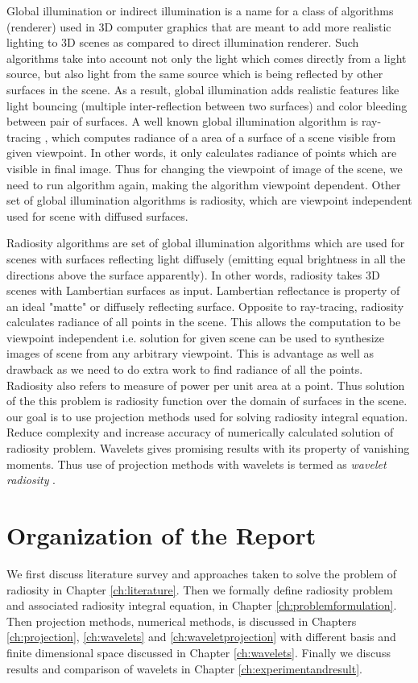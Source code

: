 Global illumination or indirect illumination is a name for a class of algorithms  (renderer) used in 3D computer graphics that are meant to add more realistic lighting to 3D scenes as compared to direct illumination renderer. Such algorithms take into account not only the light which comes directly from a light source, but also light from the same source which is being reflected by other surfaces in the scene. As a result, global illumination adds realistic features like light bouncing  (multiple inter-reflection between two surfaces) and color bleeding between pair of surfaces. A well known global illumination algorithm is ray-tracing \cite{Whitted}, which computes  radiance of a area of a surface of a scene visible  from given viewpoint. In other words, it only calculates radiance of points which are visible in final image. Thus for changing the viewpoint of image of the scene, we need to run algorithm again, making the algorithm viewpoint dependent. Other set of global illumination algorithms is radiosity, which are viewpoint independent used for scene with diffused surfaces.


Radiosity algorithms are set of global illumination algorithms which are used for scenes with surfaces reflecting light diffusely (emitting equal brightness in all the directions above the surface apparently). In other words, radiosity takes 3D scenes with Lambertian surfaces as input. Lambertian reflectance is property of an ideal "matte" or diffusely reflecting surface. Opposite to ray-tracing, radiosity calculates radiance of all points in the scene. This allows the computation to be viewpoint independent i.e. solution for given scene can be used to synthesize images of scene from any arbitrary viewpoint. This is advantage as well as drawback as we need to do extra work to find radiance of all the points. \\

Radiosity also refers to measure of power per unit area at a point. Thus solution of the this problem is radiosity function over the domain of surfaces in the scene. our goal is to use projection methods used for solving radiosity integral equation. Reduce complexity and increase accuracy of numerically calculated solution of radiosity problem. Wavelets gives promising results with its property of vanishing 
moments. Thus use of projection methods with wavelets is termed as {\em wavelet radiosity} \cite{gortler}.


\section{Organization of the Report}
We first discuss literature survey and approaches taken to solve the problem of radiosity in Chapter \ref{ch:literature}. Then we formally define radiosity problem and associated radiosity integral equation, in Chapter \ref{ch:problemformulation}. Then projection methods, numerical methods, is discussed in Chapters \ref{ch:projection}, \ref{ch:wavelets} and \ref{ch:waveletprojection} with different basis and finite dimensional space discussed in Chapter \ref{ch:wavelets}. Finally we discuss results and comparison of wavelets in Chapter \ref{ch:experimentandresult}.